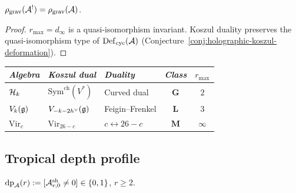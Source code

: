 \begin{proposition}
\label{prop:thqg-duality-preserves-complexity}
$\rho_{\mathrm{grav}}(\mathcal{A}^!) = \rho_{\mathrm{grav}}(\mathcal{A})$.
\end{proposition}

\begin{proof}
$r_{\max} = d_\infty$ is a quasi-isomorphism invariant.
Koszul duality preserves the quasi-isomorphism type of
$\mathrm{Def}_{\mathrm{cyc}}(\mathcal{A})$
(Conjecture~\ref{conj:holographic-koszul-deformation}).
\end{proof}

\begin{corollary}
\label{cor:thqg-duality-table}
\ClaimStatusProvedHere
\begin{center}
\small
\renewcommand{\arraystretch}{1.15}
\begin{tabular}{lllcc}
\toprule
\emph{Algebra} & \emph{Koszul dual} &
 \emph{Duality} & \emph{Class} & $r_{\max}$ \\
\midrule
$\mathcal{H}_k$ & $\mathrm{Sym}^{\mathrm{ch}}(V^*)$ &
 Curved dual & $\mathbf{G}$ & $2$ \\
$V_k(\mathfrak{g})$ & $V_{-k-2h^\vee}(\mathfrak{g})$ &
 Feigin--Frenkel & $\mathbf{L}$ & $3$ \\
$\mathrm{Vir}_c$ & $\mathrm{Vir}_{26-c}$ &
 $c \leftrightarrow 26-c$ & $\mathbf{M}$ & $\infty$ \\
\bottomrule
\end{tabular}
\end{center}
\end{corollary}



\subsection{Tropical depth profile}
\label{subsec:thqg-tropical}

\begin{definition}
\label{def:thqg-tropical-depth}
$\mathrm{dp}_{\mathcal{A}}(r) := [\mathcal{A}^{\mathrm{sh}}_{r,0} \neq 0]
\in \{0,1\}$, $r \geq 2$.
\end{definition}

